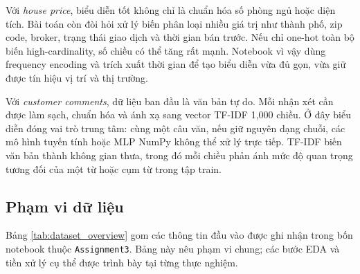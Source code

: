 \documentclass[12pt,a4paper]{report}
\newcommand{\modelpath}[1]{\texttt{#1}}
\begin{document}
Với \textit{house price}, biểu diễn tốt không chỉ là chuẩn hóa số phòng ngủ hoặc diện tích.
Bài toán còn đòi hỏi xử lý biến phân loại nhiều giá trị như thành phố, zip code, broker, trạng thái giao dịch và thời gian bán trước.
Nếu chỉ one-hot toàn bộ biến high-cardinality, số chiều có thể tăng rất mạnh.
Notebook vì vậy dùng frequency encoding và trích xuất thời gian để tạo biểu diễn vừa đủ gọn, vừa giữ được tín hiệu vị trí và thị trường.

Với \textit{customer comments}, dữ liệu ban đầu là văn bản tự do.
Mỗi nhận xét cần được làm sạch, chuẩn hóa và ánh xạ sang vector TF-IDF 1,000 chiều.
Ở đây biểu diễn đóng vai trò trung tâm: cùng một câu văn, nếu giữ nguyên dạng chuỗi, các mô hình tuyến tính hoặc MLP NumPy không thể xử lý trực tiếp.
TF-IDF biến văn bản thành không gian thưa, trong đó mỗi chiều phản ánh mức độ quan trọng tương đối của một từ hoặc cụm từ trong tập train.

\subsection{Phạm vi dữ liệu}
Bảng \ref{tab:dataset_overview} gom các thông tin đầu vào được ghi nhận trong bốn notebook thuộc \modelpath{Assignment3}.
Bảng này nêu phạm vi chung; các bước EDA và tiền xử lý cụ thể được trình bày tại từng thực nghiệm.

\begin{table}[H]
\centering
\caption{Tổng quan các bộ dữ liệu trong Assignment 03}
\label{tab:dataset_overview}
\end{table}
\end{document}
